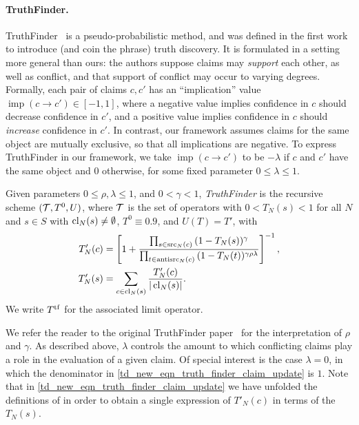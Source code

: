 \paragraph{TruthFinder.} TruthFinder~\cite{yin2008} is a pseudo-probabilistic
method, and was defined in the first work to introduce (and coin the phrase)
truth discovery. It is formulated in a setting more general than ours: the
authors suppose claims may \emph{support} each other, as well as conflict, and
that support of conflict may occur to varying degrees. Formally, each pair of
claims $c, c'$ has an ``implication'' value $\operatorname{imp}(c \to c') \in
[-1, 1]$, where a negative value implies confidence in $c$ should decrease
confidence in $c'$, and a positive value implies confidence in $c$ should
\emph{increase} confidence in $c'$. In contrast, our framework assumes claims
for the same object are mutually exclusive, so that all implications are
negative. To express TruthFinder in our framework, we take
$\operatorname{imp}(c \to c')$ to be $-\lambda$ if $c$ and $c'$ have the same
object and $0$ otherwise, for some fixed parameter $0 \le \lambda \le 1$.

\begin{definition}
    Given parameters $0 \le \rho, \lambda \le 1$, and $0 < \gamma < 1$,
    \emph{TruthFinder} is the recursive scheme $(\mathcal{T}, T^0, U)$, where $\mathcal{T}$ is
    the set of operators with $0 < T_N(s) < 1$ for all $N$ and $s \in S$ with
    $\operatorname{cl}_N(s) \ne \emptyset$, $T^0 \equiv 0.9$, and $U(T) = T'$, with
    \begin{align}
        \label{td_new_eqn_truth_finder_claim_update}
        T'_N(c) &= \left[
            1 +
            \frac{
                \prod_{s \in \operatorname{src}_N(c)}{(1 - T_N(s))^\gamma}
            }{
                \prod_{t \in \operatorname{antisrc}_N(c)}{(1 - T_N(t))^{\gamma\rho\lambda}}
            }
        \right]^{-1}, \\
        T'_N(s) &= \sum_{c \in \operatorname{cl}_N(s)}{
            \frac{T'_N(c)}{|\operatorname{cl}_N(s)|}
        }.
    \end{align}
    We write $T^{\operatorname{tf}}$ for the associated limit operator.
\end{definition}

We refer the reader to the original TruthFinder paper~\cite{yin2008} for the
interpretation of $\rho$ and $\gamma$. As described above, $\lambda$ controls
the amount to which conflicting claims play a role in the evaluation of a given
claim. Of special interest is the case $\lambda = 0$, in which the denominator
in \cref{td_new_eqn_truth_finder_claim_update} is $1$. Note that in
\cref{td_new_eqn_truth_finder_claim_update} we have unfolded the definitions of
\textcite{yin2008} in order to obtain a single expression of $T'_N(c)$ in terms
of the $T_N(s)$.

